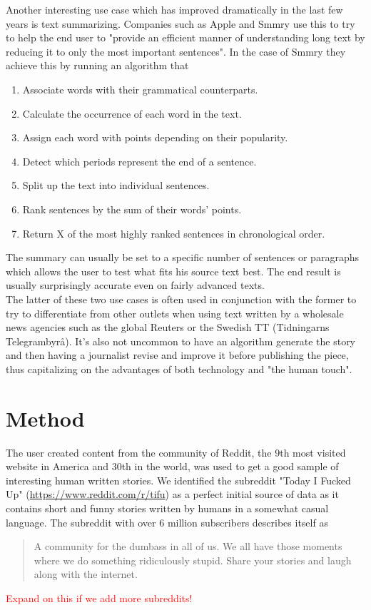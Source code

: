 \documentclass[12pt,a4paper,utf8]{article}
\newcommand\todonote[1]{\textcolor{red}{#1}}
\begin{document}
Another interesting use case which has improved dramatically in the last few years is text summarizing. Companies such as Apple and Smmry use this to try to help the end user to "provide an efficient manner of understanding long text by reducing it to only the most important sentences"\autocite{Smmry}. In the case of Smmry they achieve this by running an algorithm that
\begin{enumerate}
\item Associate words with their grammatical counterparts.
\item Calculate the occurrence of each word in the text.
\item Assign each word with points depending on their popularity.
\item Detect which periods represent the end of a sentence.
\item Split up the text into individual sentences.
\item Rank sentences by the sum of their words' points.
\item Return X of the most highly ranked sentences in chronological order.
\end{enumerate}
The summary can usually be set to a specific number of sentences or paragraphs which allows the user to test what fits his source text best. The end result is usually surprisingly accurate even on fairly advanced texts.\\

The latter of these two use cases is often used in conjunction with the former to try to differentiate from other outlets when using text written by a wholesale news agencies such as the global Reuters or the Swedish TT (Tidningarns Telegrambyrå). It's also not uncommon to have an algorithm generate the story and then having a journalist revise and improve it before publishing the piece, thus capitalizing on the advantages of both technology and "the human touch"\autocite{RobotJournalist}.

\section{Method}\label{sec:method}
The user created content from the community of Reddit, the 9th most visited website in America and 30th in the world\autocite{alexa}, was used to get a good sample of interesting human written stories. We identified the subreddit "Today I Fucked Up" (\url{https://www.reddit.com/r/tifu}) as a perfect initial source of data as it contains short and funny stories written by humans in a somewhat casual language. The subreddit with over 6 million subscribers describes itself as \begin{quote}
A community for the dumbass in all of us. We all have those moments where we do something ridiculously stupid. Share your stories and laugh along with the internet\autocite{tifu}.
\end{quote} \todonote{Expand on this if we add more subreddits!}
\end{document}
